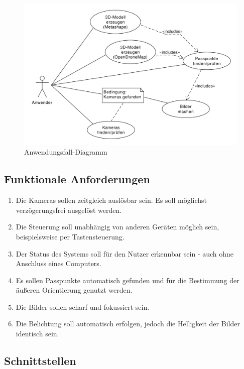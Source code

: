 \documentclass[./00PhotoBox.tex]{subfiles}
\begin{document}
\begin{figure}
    \centering
    \includegraphics[width=1\textwidth]{./img/uml/uml_usecases.pdf}
    \caption{Anwendungsfall-Diagramm}
    \label{img:anwendungsfall}
\end{figure}


\subsection{Funktionale Anforderungen}
\begin{enumerate}[label=F\arabic*]
    \item \label{e:zeitgleich} Die Kameras sollen zeitgleich auslösbar sein. Es soll möglichst ver\-zögerungs\-frei ausgelöst werden.
    \item \label{e:button} Die Steuerung soll unabhängig von anderen Geräten möglich sein, beispielsweise per Tastensteuerung.
    \item \label{e:status} Der Status des Systems soll für den Nutzer erkennbar sein - auch ohne Anschluss eines Computers.
    \item \label{e:passpunkte} Es sollen Passpunkte automatisch gefunden und für die Bestimmung der äußeren Orientierung genutzt werden.
    \item \label{e:scharf} Die Bilder sollen scharf und fokussiert sein.
    \item \label{e:licht} Die Belichtung soll automatisch erfolgen, jedoch die Helligkeit der Bilder identisch sein.
\end{enumerate}

\subsection{Schnittstellen}
\end{document}
